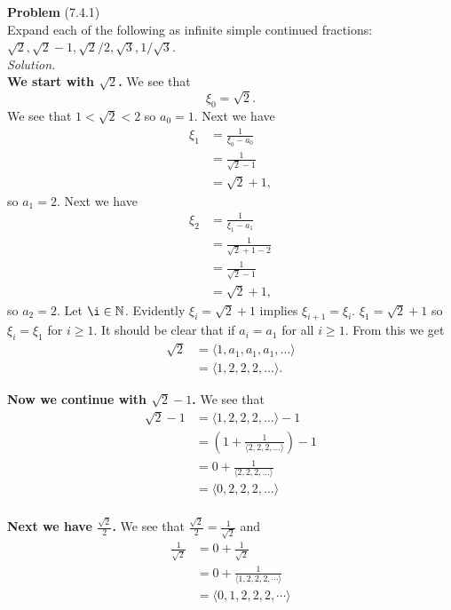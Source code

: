 \documentclass[12 pt]{amsart}
\begin{document}
\phantom{\quad} \vfill
\noindent
\textbf{Problem} (7.4.1) \\[4ex]
  Expand each of the following as infinite simple continued fractions:
  $\sqrt{2}, \sqrt{2} - 1, \sqrt{2}/2, \sqrt{3}, 1/\sqrt{3}$.
  \\[2ex]
\emph{Solution.} \\[2ex]
  \indent
  \textbf{We start with $\sqrt{2}$.}
  We see that
  \[
    \xi_0 = \sqrt{2}.
  \]
  We see that $1 < \sqrt{2} < 2$ so $a_0 = 1$.
  Next we have
  \begin{align*}
    \xi_1 &= \frac{1}{\xi_0 - a_0} \\
          &= \frac{1}{\sqrt{2} - 1} \\
          &= \sqrt{2} + 1,
  \end{align*}
  so $a_1 = 2$.
  Next we have
  \begin{align*}
    \xi_2 &= \frac{1}{\xi_1 - a_1} \\
          &= \frac{1}{\sqrt{2} + 1 - 2} \\
          &= \frac{1}{\sqrt{2} - 1} \\
          &= \sqrt{2} + 1,
  \end{align*}
  so $a_2 = 2$.
  Let $\i \in \mathbb{N}$.
  Evidently $\xi_i = \sqrt{2} + 1$ implies
  $\xi_{i+1} = \xi_i$. 
  $\xi_1 = \sqrt{2} + 1$ so $\xi_i = \xi_1$ for $i \geq 1$.
  It should be clear that if $a_i = a_1$ for all $i \geq 1$.
  From this we get
  \begin{align*}
    \sqrt{2}
    &=
    \langle 1, a_1, a_1, a_1, \ldots \rangle \\
    &=
    \langle 1, 2, 2, 2, \ldots \rangle.
  \end{align*}

  \textbf{Now we continue with $\sqrt{2} - 1$.}
  We see that
  \begin{align*}
    \sqrt{2} - 1 
    &= 
      \langle 1, 2, 2, 2, \ldots \rangle - 1\\
    &= 
      \left(
        1 + \frac{1}{\langle 2, 2, 2, \ldots \rangle}
      \right) - 1 \\
    &= 
      0 + \frac{1}{\langle 2, 2, 2, \ldots \rangle} \\
    &= 
      \langle 0, 2, 2, 2, \ldots \rangle \\
  \end{align*}

  \textbf{Next we have $\frac{\sqrt{2}}{2}$.}
  We see that $\frac{\sqrt{2}}{2} = \frac{1}{\sqrt{2}}$ and
  \begin{align*}
    \frac{1}{\sqrt{2}} 
    &=
      0 + \frac{1}{\sqrt{2}}  \\
    &=  
      0 + \frac{1}{\langle 1, 2, 2, 2, \cdots \rangle} \\
    &=  
      \langle 0, 1, 2, 2, 2, \cdots \rangle
  \end{align*}
\end{document}
